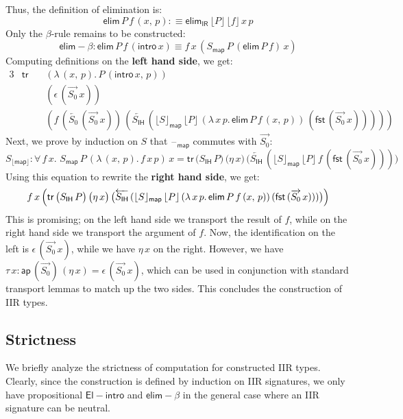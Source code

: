 \documentclass[acmsmall,screen,review,anonymous]{acmart}
\newcommand{\msf}[1]{{\mathsf{#1}}}
\newcommand{\blank}{{\mathord{\hspace{1pt}\text{--}\hspace{1pt}}}}
\newcommand{\IR}{\msf{IR}}
\newcommand{\intro}{\msf{intro}}
\newcommand{\IH}{\msf{IH}}
\newcommand{\map}{\msf{map}}
\newcommand{\elim}{\msf{elim}}
\newcommand{\tr}{\msf{tr}}
\newcommand{\fst}{\msf{fst}}
\newcommand{\floord}[1]{\lfloor #1 \rfloor}
\newcommand{\ora}[1]{\overrightarrow{#1}}
\newcommand{\ola}[1]{\overleftarrow{#1}}
\newcommand{\ap}{\msf{ap}}
\begin{document}
Thus, the definition of elimination is:
\[ \elim\,P\,f\,(x,\,p) :\equiv \elim_\IR\,\floord{P}\,\floord{f}\,x\,p \]
Only the $\beta$-rule remains to be constructed:
\[ \elim\!-\!\!\beta : \elim\,P\,f\,(\intro\,x) \equiv f\,x\,(S_\map\,P\,(\elim\,P\,f)\,x) \]
Computing definitions on the \textbf{left hand side}, we get:
\begin{alignat*}{3}
  & \tr\, &&(\lambda\,(x,\,p).\,P\,(\intro\,x,\,p))\\
  &       &&(\epsilon\,(\ora{S_0}\,x))\\
  &       &&(f\,(\ola{S_0}\,(\ora{S_0}\,x))\,(\ola{S_\IH}\,(\floord{S}_\map\,\floord{P}\,(\lambda\,x\,p.\,\elim\,P\,f\,(x,\,p))\,(\fst\,(\ora{S_0}\,x)))))
\end{alignat*}
Next, we prove by induction on $S$ that $\blank_\map$ commutes with $\ora{S_0}$:
\[ S_{\floord{\map}} : \forall\,f\,x.\,\,S_\map\,P\,(\lambda\,(x,\,p).\,f\,x\,p)\,x = \tr\,\bigl(S_\IH\,P\bigr)\,\bigl(\eta\,x\bigr)\,\bigl(\ola{S_\IH}\,(\floord{S}_\map\,\floord{P}\,f\,(\fst\,(\ora{S_0}\,x)))\bigr)\]
Using this equation to rewrite the \textbf{right hand side}, we get:
\begin{alignat*}{3}
  f\,x\,\Bigl(\tr\,\bigl(S_\IH\,P\bigr)\,\bigl(\eta\,x\bigr)\,\bigl(\ola{S_\IH}\,(\floord{S}_\map\,\floord{P}\,(\lambda\,x\,p.\,\elim\,P\,f\,(x,\,p))\,(\fst\,(\ora{S_0}\,x)))\bigr)\Bigr)
\end{alignat*}
This is promising; on the left hand side we transport the result of $f$, while on the right hand
side we transport the argument of $f$. Now, the identification on the left is
$\epsilon\,(\ora{S_0}\,x)$, while we have $\eta\,x$ on the right. However, we have $\tau\,x :
\ap\,(\ora{S_0})\,(\eta\,x) = \epsilon\,(\ora{S_0}\,x)$, which can be used in conjunction with
standard transport lemmas to match up the two sides. This concludes the construction of IIR types.

\subsection{Strictness}
We briefly analyze the strictness of computation for constructed IIR types. Clearly, since the
construction is defined by induction on IIR signatures, we only have propositional
$\msf{El\!\!-\!\!intro}$ and $\elim\!-\!\!\beta$ in the general case where an IIR signature can be
neutral.
\end{document}
